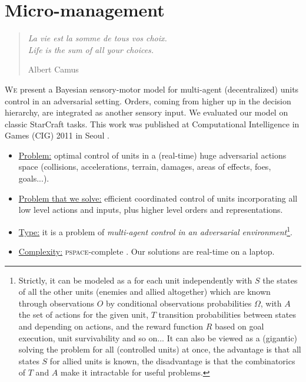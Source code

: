 \chapter{Micro-management}
\begin{quotation}
\noindent
\textit{La vie est la somme de tous vos choix.
\vspace{0.2cm}\\
Life is the sum of all your choices.}
\begin{flushright}Albert Camus\end{flushright}
\end{quotation}

\lettrine{W}{e} present a Bayesian sensory-motor model for multi-agent (decentralized) units control in an adversarial setting. Orders, coming from higher up in the decision hierarchy, are integrated as another sensory input. We evaluated our model on classic StarCraft  tasks. This work was published at Computational Intelligence in Games (CIG) 2011 in Seoul \citep{SYNNAEVE:Micro}.

\chaptertoc
{}

\begin{itemize}
\item \underline{Problem:} optimal control of units in a (real-time) huge adversarial actions space (collisions, accelerations, terrain, damages, areas of effects, foes, goals...).
\item \underline{Problem that we solve:} efficient coordinated control of units incorporating all low level actions and inputs, plus higher level orders and representations.
\item \underline{Type:} it is a problem of \textit{multi-agent control in an adversarial environment}\footnote{Strictly, it can be modeled as a  for each unit independently with $S$ the states of all the other units (enemies and allied altogether) which are known through observations $O$ by conditional observations probabilities $\Omega$, with $A$ the set of actions for the given unit, $T$ transition probabilities between states and depending on actions, and the reward function $R$ based on goal execution, unit survivability and so on... It can also be viewed as a (gigantic)  solving the problem for all (controlled units) at once, the advantage is that all states $S$ for allied units is known, the disadvantage is that the combinatorics of $T$ and $A$ make it intractable for useful problems.}.
\item \underline{Complexity:} \textsc{pspace}-complete \citep{Papadimitriou87,GamingComplexity}. Our solutions are real-time on a laptop.
\end{itemize}

